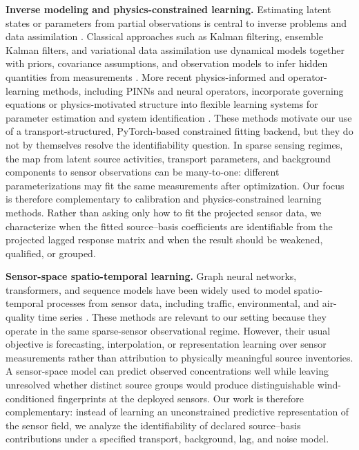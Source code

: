 \noindent\textbf{Inverse modeling and physics-constrained learning.}
Estimating latent states or parameters from partial observations is central to
inverse problems and data assimilation \citep{tarantola2005inverse,engl1996regularization}.
Classical approaches such as Kalman filtering, ensemble Kalman filters, and
variational data assimilation use dynamical models together with priors,
covariance assumptions, and observation models to infer hidden quantities from
measurements \citep{wang2023kalman,carrassi2018data}. More recent physics-informed
and operator-learning methods, including PINNs and neural operators, incorporate
governing equations or physics-motivated structure into flexible learning systems
for parameter estimation and system identification
\citep{raissi2019physics,li2024physics,li2020fourier,bhardwaj2025fieldformer}.
These methods motivate our use of a transport-structured, PyTorch-based
constrained fitting backend, but they do not by themselves resolve the
identifiability question. In sparse sensing regimes, the map from latent source
activities, transport parameters, and background components to sensor
observations can be many-to-one: different parameterizations may fit the same
measurements after optimization. Our focus is therefore complementary to
calibration and physics-constrained learning methods. Rather than asking only how
to fit the projected sensor data, we characterize when the fitted source--basis
coefficients are identifiable from the projected lagged response matrix and when
the result should be weakened, qualified, or grouped.

\noindent\textbf{Sensor-space spatio-temporal learning.}
Graph neural networks, transformers, and sequence models have been widely used to
model spatio-temporal processes from sensor data, including traffic,
environmental, and air-quality time series
\citep{li2017diffusion,yu2017spatio,wu2019graph,chen2023group,iyer2022modeling,bhardwaj2025comprehensive,bhardwaj2025fieldformer}.
These methods are relevant to our setting because they operate in the same
sparse-sensor observational regime. However, their usual objective is
forecasting, interpolation, or representation learning over sensor measurements
rather than attribution to physically meaningful source inventories. A
sensor-space model can predict observed concentrations well while leaving
unresolved whether distinct source groups would produce distinguishable
wind-conditioned fingerprints at the deployed sensors. Our work is therefore
complementary: instead of learning an unconstrained predictive representation of
the sensor field, we analyze the identifiability of declared source--basis
contributions under a specified transport, background, lag, and noise model.

